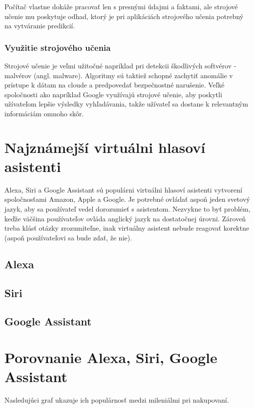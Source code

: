 \documentclass[10pt,twoside,slovak,coursepaper]{article}
\begin{document}
Počítač vlastne dokáže pracovať len s presnými údajmi a faktami, ale strojové učenie mu poskytuje odhad, ktorý je pri aplikáciách strojového učenia potrebný na vytváranie predikcií.

\subsubsection{Využitie strojového učenia}

Strojové  učenie je veľmi užitočné napríklad pri detekcii škodlivých softvérov - malvérov (angl. malware). \cite{Labus} Algoritmy sú taktiež schopné zachytiť anomálie v prístupe k dátam na cloude a predpovedať bezpečnostné narušenie. Veľké spoločnosti ako napríklad Google využívajú strojové učenie, aby poskytli užívateľom lepšie výsledky vyhľadávania, takže užívateľ sa dostane k relevantným informáciám omnoho skôr.

\section{Najznámejší virtuálni hlasoví asistenti}

Alexa, Siri a Google Assistant sú populárni virtuálni hlasoví asistenti vytvorení spoločnosťami Amazon, Apple a Google. Je potrebné ovládať aspoň jeden svetový jazyk, aby sa používateľ vedel dorozumieť s asistentom.\cite{Kadlec} Nezvykne to byť problém, keďže väčšina používateľov ovláda anglický jazyk na dostatočnej úrovni. Zároveň treba klásť otázky zrozumiteľne, inak virtuálny asistent nebude reagovať korektne (aspoň používateľovi sa bude zdať, že nie).

\subsection{Alexa}
\subsection{Siri}
\subsection{Google Assistant}
\section{Porovnanie Alexa, Siri, Google Assistant}
Nasledujúci graf ukazuje ich populárnosť medzi mileniálmi pri nakupovaní.\cite{Kinsella}
\end{document}
